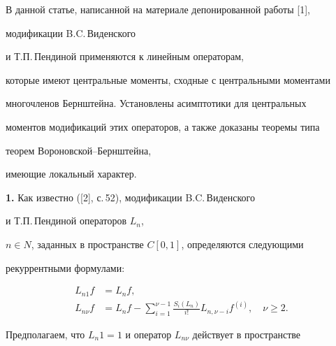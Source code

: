  




\maketitle 


\label{begin} 


 


 


 


В данной статье, написанной на материале депонированной работы [1],


модификации B.C.\,Ви\-денского 


и Т.П.\,Пендиной применяются к линейным операторам, 


которые имеют центральные моменты, сходные с центральными моментами 


многочленов Бернштейна. Установлены асимптотики для центральных 


моментов модификаций этих операторов, а также доказаны теоремы типа 


теорем Вороновской--Бернштейна, 


имеющие локальный характер. 


\medskip 


 


{\bf 1.} Как известно ([2], с.\,52), модификации B.C.\,Виденского 


и Т.П.\,Пендиной операторов $L_n$, 


$n\in N$, заданных в пространстве $C[0,1]$, определяются следующими 


рекуррентными формулами: 


\begin{equation} 


\begin{split} 


L_{n1}f&=L_n f, \\ 


L_{n\nu}f&=L_n f-\sum^{\nu-1}_{i=1}\frac{S_i(L_n)}{i!} 


L_{n,\nu-i}f^{(i)},\quad \nu\ge2. 


\end{split} 


\end{equation} 


Предполагаем, что $L_n1=1$ и оператор $L_{n\nu}$ действует в пространстве 



